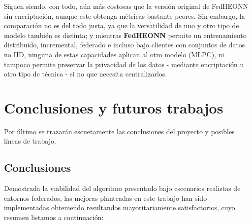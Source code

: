 \documentclass[00-Trabajo_Final.tex]{subfiles}
\begin{document}
Siguen siendo, con todo, aún más costosas que la versión original de FedHEONN sin encriptación, aunque este obtenga métricas bastante peores. Sin embargo, la comparación no es del todo justa, ya que la versatilidad de uno y otro tipo de modelo también es distinta; y mientras \textbf{FedHEONN} permite un entrenamiento distribuido, incremental, federado e incluso bajo clientes con conjuntos de datos no IID, ninguna de estas capacidades aplican al otro modelo (MLPC), ni tampoco permite preservar la privacidad de los datos - mediante encriptación u otro tipo de técnica - si no que necesita centralizarlos.

\newpage

\section{Conclusiones y futuros trabajos}
Por último se trazarán escuetamente las conclusiones del proyecto y posibles líneas de trabajo.

\subsection{Conclusiones}
Demostrada la viabilidad del algoritmo presentado bajo escenarios realistas de entornos federados, las mejoras planteadas en este trabajo han sido implementadas obteniendo resultandos mayoritariamente satisfactorios, cuyo resumen listamos a continuación:
\end{document}
